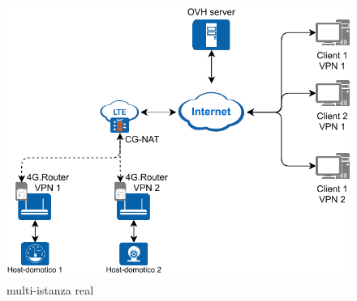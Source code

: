 \begin{figure}
    \centering
    \includegraphics[width=0.8\linewidth]{immagini/diag2-multiistanza_real}
    \caption{multi-istanza real}
    \label{fig:diag2-multiistanza_real}
\end{figure}



